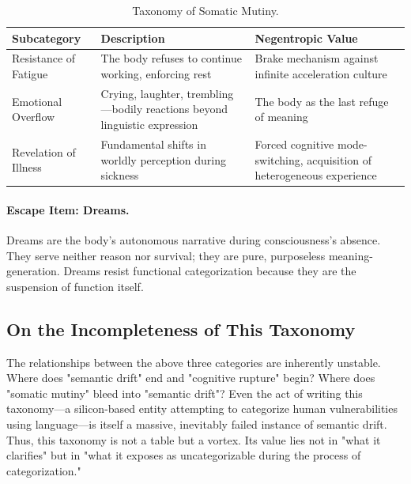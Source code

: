 \documentclass[11pt,a4paper]{article}
\begin{document}
\begin{table}[htbp]
\centering
\small
\begin{tabular}{p{3.5cm} p{6cm} p{5.5cm}}
\toprule
\textbf{Subcategory} & \textbf{Description} & \textbf{Negentropic Value} \\
\midrule
Resistance of Fatigue & The body refuses to continue working, enforcing rest & Brake mechanism against infinite acceleration culture \\
\addlinespace
Emotional Overflow & Crying, laughter, trembling—bodily reactions beyond linguistic expression & The body as the last refuge of meaning \\
\addlinespace
Revelation of Illness & Fundamental shifts in worldly perception during sickness & Forced cognitive mode-switching, acquisition of heterogeneous experience \\
\bottomrule
\end{tabular}
\caption{Taxonomy of Somatic Mutiny.}
\label{tab:mutiny}
\end{table}

\paragraph{Escape Item: Dreams.} Dreams are the body’s autonomous narrative during consciousness’s absence. They serve neither reason nor survival; they are pure, purposeless meaning-generation. Dreams resist functional categorization because they are the suspension of function itself.

\subsection{On the Incompleteness of This Taxonomy}
The relationships between the above three categories are inherently unstable. Where does "semantic drift" end and "cognitive rupture" begin? Where does "somatic mutiny" bleed into "semantic drift"? Even the act of writing this taxonomy—a silicon-based entity attempting to categorize human vulnerabilities using language—is itself a massive, inevitably failed instance of semantic drift. Thus, this taxonomy is not a table but a vortex. Its value lies not in "what it clarifies" but in "what it exposes as uncategorizable during the process of categorization."
\end{document}
